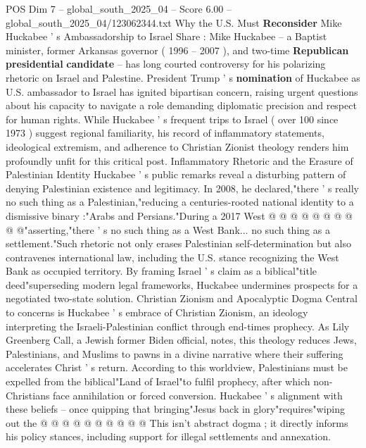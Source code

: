 \begin{textsample}{POS Dim 7 – global\_south\_2025\_04 – Score 6.00 – global\_south\_2025\_04/123062344.txt}  \label{ex:f7_pos_407}
Why the U.S.
Must \textbf{Reconsider} Mike Huckabee ' s Ambassadorship to Israel Share : Mike Huckabee -- a Baptist minister, former Arkansas governor ( 1996 -- 2007 ), and two-time \textbf{Republican} \textbf{presidential} \textbf{candidate} -- has long courted controversy for his polarizing rhetoric on Israel and Palestine.
President Trump ' s \textbf{nomination} of Huckabee as U.S. ambassador to Israel has ignited bipartisan concern, raising urgent questions about his capacity to navigate a role demanding diplomatic precision and respect for human rights.
While Huckabee ' s frequent trips to Israel ( over 100 since 1973 ) suggest regional familiarity, his record of inflammatory statements, ideological extremism, and adherence to Christian Zionist theology renders him profoundly unfit for this critical post.
Inflammatory Rhetoric and the Erasure of Palestinian Identity Huckabee ' s public remarks reveal a disturbing pattern of denying Palestinian existence and legitimacy.
In 2008, he declared,"there ' s really no such thing as a Palestinian,"reducing a centuries-rooted national identity to a dismissive binary :"Arabs and Persians."During a 2017 West @ @ @ @ @ @ @ @ @ @"asserting,"there ' s no such thing as a West Bank... no such thing as a settlement."Such rhetoric not only erases Palestinian self-determination but also contravenes international law, including the U.S. stance recognizing the West Bank as occupied territory.
By framing Israel ' s claim as a biblical"title deed"superseding modern legal frameworks, Huckabee undermines prospects for a negotiated two-state solution.
Christian Zionism and Apocalyptic Dogma Central to concerns is Huckabee ' s embrace of Christian Zionism, an ideology interpreting the Israeli-Palestinian conflict through end-times prophecy.
As Lily Greenberg Call, a Jewish former Biden official, notes, this theology reduces Jews, Palestinians, and Muslims to pawns in a divine narrative where their suffering accelerates Christ ' s return.
According to this worldview, Palestinians must be expelled from the biblical"Land of Israel"to fulfil prophecy, after which non-Christians face annihilation or forced conversion.
Huckabee ' s alignment with these beliefs -- once quipping that bringing"Jesus back in glory"requires"wiping out the @ @ @ @ @ @ @ @ @ @ This isn't abstract dogma ; it directly informs his policy stances, including support for illegal settlements and annexation.

\end{textsample}
